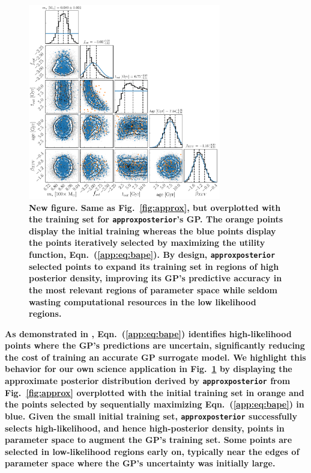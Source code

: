 \documentclass[twocolumn]{aastex62}
\newcommand{\xxx}[1]{{\textbf{#1}}}
\newcommand{\approxposterior}[0]{\texttt{approxposterior}\xspace}
\begin{document}
\begin{figure}[h]
\centering
	\includegraphics[width=0.75\textwidth]{../Analysis/Validation/points.pdf}
   \caption{\xxx{New figure. Same as Fig.~\ref{fig:approx}, but overplotted with the training set for \approxposterior's GP. The orange points display the initial training whereas the blue points display the points iteratively selected by maximizing the \citet{Kandasamy2017} utility function, Eqn.~(\ref{app:eq:bape}). By design, \approxposterior selected points to expand its training set in regions of high posterior density, improving its GP's predictive accuracy in the most relevant regions of parameter space while seldom wasting computational resources in the low likelihood regions.}}%
    \label{fig:points}%
\end{figure}

\xxx{As demonstrated in \citet{Kandasamy2017}, Eqn.~(\ref{app:eq:bape}) identifies high-likelihood points where the GP's predictions are uncertain, significantly reducing the cost of training an accurate GP surrogate model. We highlight this behavior for our own science application in Fig.~\ref{fig:points} by displaying the approximate posterior distribution derived by \approxposterior from Fig.~\ref{fig:approx} overplotted with the initial training set in orange and the points selected by sequentially maximizing Eqn.~(\ref{app:eq:bape}) in blue. Given the small initial training set, \approxposterior successfully selects high-likelihood, and hence high-posterior density, points in parameter space to augment the GP's training set. Some points are selected in low-likelihood regions early on, typically near the edges of parameter space where the GP's uncertainty was initially large.}
\end{document}
